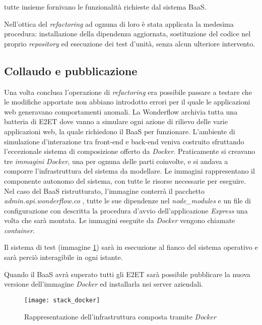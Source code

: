 tutte insieme fornivano le funzionalità richieste dal sistema \gls{BaaS}.

Nell'ottica del \textit{refactoring} ad ognuna di loro è stata applicata la
medesima procedura: installazione della dipendenza aggiornata, sostituzione del
codice nel proprio \textit{repository} ed esecuzione dei test d'unità, senza
alcun ulteriore intervento.

\subsection{Collaudo e pubblicazione}
Una volta conclusa l'operazione di \textit{refactoring} era possibile passare
a testare che le modifiche apportate non abbiano introdotto errori per il quale
le applicazioni web generavano comportamenti anomali. La Wonderflow archivia
tutta una batteria di \gls{E2ET} dove vanno a simulare ogni azione di rilievo
delle varie applicazioni web, la quale richiedono il \gls{BaaS} per funzionare.
L'ambiente di simulazione d'interazione tra \gls{front-end} e \gls{back-end}
veniva costruito sfruttando l'eccezionale sistema di composizione offerto da
\textit{Docker}. Praticamente si creavano tre \textit{immagini Docker}, una per
ognuna delle parti coinvolte, e si andava a comporre l'infrastruttura del
sistema da modellare. Le immagini rappresentano il componente autonomo del
sistema, con tutte le risorse necessarie per eseguire. Nel caso del \gls{BaaS}
ristrutturato, l'immagine conterrà il pacchetto \textit{admin.api.wonderflow.co}
, tutte le sue dipendenze nel \textit{node\_modules} e un file di configurazione
con descritta la procedura d'avvio dell'applicazione \textit{Express} una volta
che sarà montata. Le immagini eseguite da \textit{Docker} vengono chiamate
\textit{container}.

Il sistema di test (immagine \ref{fig:stack_docker}) sarà in esecuzione al
fianco del sistema operativo e sarà perciò interagibile in ogni istante.

Quando il \gls{BaaS} avrà superato tutti gli \gls{E2ET} sarà possibile
pubblicare la nuova versione dell'immagine \textit{Docker} ed installarla nei
server aziendali.

\begin{figure}[H]
\begin{center}
\texttt{[image: stack\_docker]}
\caption{
Rappresentazione dell'infrastruttura composta tramite \textit{Docker}
}
\label{fig:stack_docker}
\end{center}
\end{figure}

